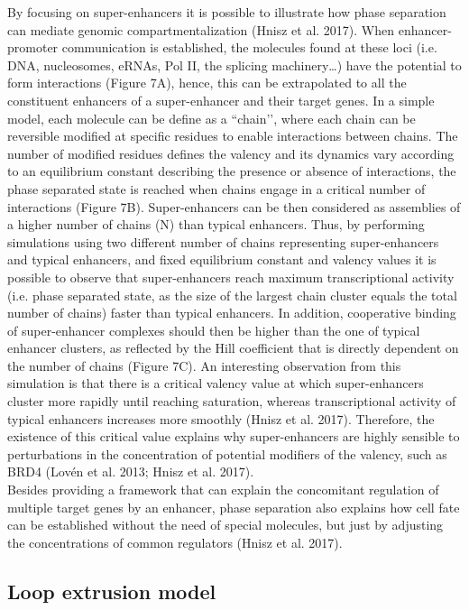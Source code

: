 By focusing on super-enhancers it is possible to illustrate how phase separation can mediate genomic compartmentalization (Hnisz et al. 2017). When enhancer-promoter communication is established, the molecules found at these loci (i.e. DNA, nucleosomes, eRNAs, Pol II, the splicing machinery…) have the potential to form interactions (Figure 7A), hence, this can be extrapolated to all the constituent enhancers of a super-enhancer and their target genes. In a simple model, each molecule can be define as a ``chain’’, where each chain can be reversible modified at specific residues to enable interactions between chains. The number of modified residues defines the valency and its dynamics vary according to an equilibrium constant describing the presence or absence of interactions, the phase separated state is reached when chains engage in a critical number of interactions (Figure 7B). Super-enhancers can be then considered as assemblies of a higher number of chains (N) than typical enhancers. Thus, by performing simulations using two different number of chains representing super-enhancers and typical enhancers, and fixed equilibrium constant and valency values it is possible to observe that super-enhancers reach maximum transcriptional activity (i.e. phase separated state, as the size of the largest chain cluster equals the total number of chains) faster than typical enhancers. In addition, cooperative binding of super-enhancer complexes should then be higher than the one of typical enhancer clusters, as reflected by the Hill coefficient that is directly dependent on the number of chains (Figure 7C). An interesting observation from this simulation is that there is a critical valency value at which super-enhancers cluster more rapidly until reaching saturation, whereas transcriptional activity of typical enhancers increases more smoothly (Hnisz et al. 2017). Therefore, the existence of this critical value explains why super-enhancers are highly sensible to perturbations in the concentration of potential modifiers of the valency, such as BRD4 (Lovén et al. 2013; Hnisz et al. 2017).\\

Besides providing a framework that can explain the concomitant regulation of multiple target genes by an enhancer, phase separation also explains how cell fate can be established without the need of special molecules, but just by adjusting the concentrations of common regulators (Hnisz et al. 2017).\\

		\subsection{Loop extrusion model}


